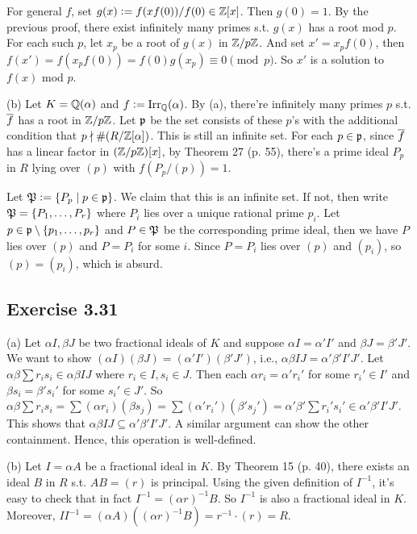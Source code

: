 \documentclass[../Marcus.tex]{subfiles}
\begin{document}
For general $f$, set $g(x):=f(xf(0))/f(0)\in\mathbb{Z}[x]$. Then $g(0)=1$. By the previous proof, there exist infinitely many primes s.t. $g(x)$ has a root mod $p$. For each such $p$, let $x_p$ be a root of $g(x)$ in $\mathbb{Z}/p\mathbb{Z}$. And set $x'=x_pf(0)$, then $f(x')=f(x_pf(0))=f(0)g(x_p)\equiv 0\pmod{p}$. So $x'$ is a solution to $f(x)$ mod $p$.

(b) Let $K=\mathbb{Q}(\alpha)$ and $f:=\operatorname{Irr}_{\mathbb{Q}}(\alpha)$. By (a), there're infinitely many primes $p$ s.t. $\overline{f}$ has a root in $\mathbb{Z}/p\mathbb{Z}$. Let $\mathfrak{p}$ be the set consists of these $p$'s with the additional condition that $p\nmid \#(R/\mathbb{Z}[\alpha])$. This is still an infinite set. For each $p\in\mathfrak{p}$, since $\overline{f}$ has a linear factor in $(\mathbb{Z}/p\mathbb{Z})[x]$, by Theorem 27 (p. 55), there's a prime ideal $P_p$ in $R$ lying over $(p)$ with $f(P_p/(p))=1$.

Let $\mathfrak{P}:=\{P_p\mid p\in\mathfrak{p}\}$. We claim that this is an infinite set. If not, then write $\mathfrak{P}=\{P_1,\ldots,P_r\}$ where $P_i$ lies over a unique rational prime $p_i$. Let $p\in\mathfrak{p}\setminus\{p_1,\ldots,p_r\}$ and $P\in\mathfrak{P}$ be the corresponding prime ideal, then we have $P$ lies over $(p)$ and $P=P_i$ for some $i$. Since $P=P_i$ lies over $(p)$ and $(p_i)$, so $(p)=(p_i)$, which is absurd.

\subsection*{Exercise 3.31}

(a) Let $\alpha I,\beta J$ be two fractional ideals of $K$ and suppose $\alpha I=\alpha'I'$ and $\beta J=\beta'J'$. We want to show $(\alpha I)(\beta J)=(\alpha'I')(\beta'J')$, i.e., $\alpha\beta IJ=\alpha'\beta'I'J'$. Let $\alpha\beta\sum r_is_i\in\alpha\beta IJ$ where $r_i\in I,s_i\in J$. Then each $\alpha r_i=\alpha'r_i'$ for some $r_i'\in I'$ and $\beta s_i=\beta's_i'$ for some $s_i'\in J'$. So $\alpha\beta \sum r_is_i=\sum (\alpha r_i)(\beta s_j) = \sum (\alpha'r_i')(\beta's_j') = \alpha'\beta' \sum r_i's_i' \in \alpha'\beta' I'J'$. This shows that $\alpha\beta IJ\subseteq \alpha'\beta'I'J'$. A similar argument can show the other containment. Hence, this operation is well-defined.

(b) Let $I=\alpha A$ be a fractional ideal in $K$. By Theorem 15 (p. 40), there exists an ideal $B$ in $R$ s.t. $AB=(r)$ is principal. Using the given definition of $I^{-1}$, it's easy to check that in fact $I^{-1}=(\alpha r)^{-1}B$. So $I^{-1}$ is also a fractional ideal in $K$. Moreover, $II^{-1}=(\alpha A)((\alpha r)^{-1}B)=r^{-1}\cdot(r)=R$.
\end{document}
